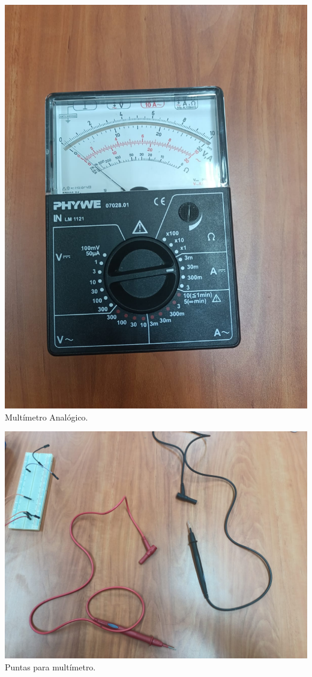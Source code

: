 \documentclass[10pt]{article}
\begin{document}
\begin{multicols}{2}
\begin{center}
	\includegraphics[scale = 0.1]{Imagenes/Material/MultiA.jpeg}\\
	Multímetro Analógico.

	\includegraphics[scale = 0.1]{Imagenes/Material/Puntas.jpeg}\\
	Puntas para multímetro.


\end{center}
\end{multicols}
\end{document}
